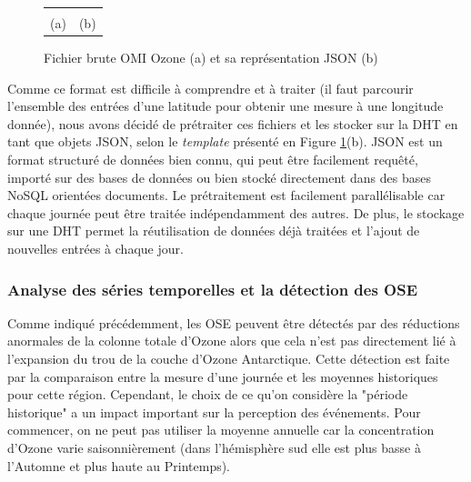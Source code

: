 \begin{figure}
	\centering
	\begin{tabular}{cc}
		\imagetop{\TOMS}&\imagetop{\JSON}\\
		{\small (a)}&{\small (b)}
	\end{tabular}
	\caption{Fichier brute OMI Ozone (a) et sa représentation JSON (b)}\label{fig:toms}
	
\end{figure}

Comme ce format est difficile à comprendre et à traiter (il faut parcourir l'ensemble des entrées d'une latitude pour obtenir une mesure à une longitude donnée), nous avons décidé de prétraiter ces fichiers et les stocker sur la DHT en tant que objets JSON, selon le \textit{template} présenté en Figure \ref{fig:toms}(b). JSON est un format structuré de données bien connu, qui peut être facilement requêté, importé sur des bases de données ou bien stocké directement dans des bases NoSQL orientées  documents. Le prétraitement est facilement parallélisable car chaque journée peut être traitée indépendamment des autres. De plus, le stockage sur une DHT permet la réutilisation de données déjà traitées et l'ajout de nouvelles entrées à chaque jour. 

\subsubsection{Analyse des séries temporelles et la détection des OSE\label{sec:timeseries}}

Comme indiqué précédemment, les OSE peuvent être détectés par des réductions anormales de la colonne totale d'Ozone alors que cela n'est pas directement lié à l'expansion du trou de la couche d'Ozone Antarctique. Cette détection est faite par la comparaison entre la mesure d'une journée et les moyennes historiques pour cette région. Cependant, le choix de ce qu'on considère la "période historique" a un impact important sur la perception des événements. Pour commencer, on ne peut pas utiliser la moyenne annuelle car la concentration d'Ozone varie saisonnièrement (dans l'hémisphère sud elle est plus basse à l'Automne et plus haute au Printemps). 

